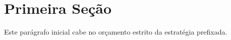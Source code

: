 \documentclass{article}
\begin{document}
\section{Primeira Seção}
Este parágrafo inicial cabe no orçamento estrito da estratégia prefixada.

\end{document}
